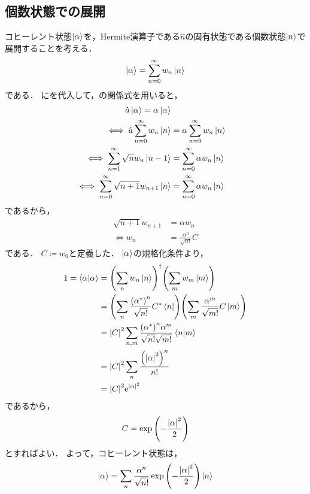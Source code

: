 \documentclass{report}
\begin{document}
  \subsection{個数状態での展開}
    コヒーレント状態$\ket{\alpha}$を，Hermite演算子である$\hat{n}$の固有状態である個数状態$\ket{n}$で展開することを考える．
    \begin{align}
      \ket{\alpha} = \sum_{n = 0}^{\infty}w_n\ket{n}\label{coherent-expantion}
    \end{align}
    である．
    にを代入して，の関係式を用いると，
    \begin{align}
      \hat{a}\ket{\alpha} = \alpha\ket{\alpha} \\ 
      \iff \hat{a}\sum_{n = 0}^{\infty}w_n\ket{n} &= \alpha\sum_{n = 0}^{\infty}w_n\ket{n} \\ 
      \iff \sum_{n = 1}^{\infty}\sqrt{n}w_n\ket{n - 1} &= \sum_{n = 0}^{\infty}\alpha w_n\ket{n} \\ 
      \iff \sum_{n = 0}^{\infty}\sqrt{n + 1}w_{n + 1}\ket{n} &= \sum_{n = 0}^{\infty}\alpha w_n\ket{n}
    \end{align}
    であるから，
    \begin{align}
      \sqrt{n + 1}w_{n + 1} &= \alpha w_n \\ 
      \iff w_n &= \frac{\alpha^n}{\sqrt{n!}}C
    \end{align}
    である．
    $C \coloneqq w_0$と定義した．
    $\ket{\alpha}$の規格化条件より，
    \begin{align}
      1 = \braket{\alpha}{\alpha} &= \qty(\sum_{n}w_n\ket{n})^{\dag}\qty(\sum_{m}w_m\ket{m}) \\ 
      &= \qty(\sum_{n}\frac{\qty(\alpha^*)^n}{\sqrt{n!}}C^*\bra{n})\qty(\sum_{m}\frac{\alpha^m}{\sqrt{m!}}C\ket{m}) \\ 
      &= \abs{C}^2\sum_{n, m}\frac{\qty(\alpha^*)^n\alpha^m}{\sqrt{n!}\sqrt{m!}}\braket{n}{m} \\ 
      &= \abs{C}^2\sum_{n}\frac{\qty(\abs{\alpha}^2)^n}{n!} \\ 
      &= \abs{C}^2\mathrm{e}^{\abs{\alpha}^2}
    \end{align}
    であるから，
    \begin{align}
      C = \exp\qty(-\frac{\abs{\alpha}^2}{2})
    \end{align}
    とすればよい．
    よって，コヒーレント状態は，
    \begin{align}
      \ket{\alpha} = \sum_n \frac{\alpha^n}{\sqrt{n!}}\exp\qty(-\frac{\abs{\alpha}^2}{2})\ket{n}\label{coherent-number-state-expantion}
    \end{align}
\end{document}
